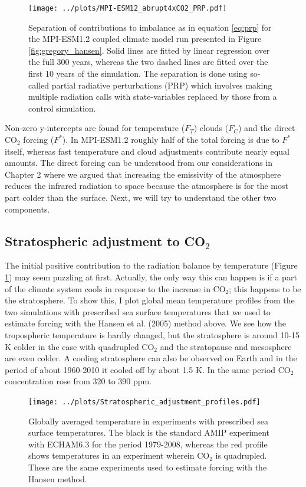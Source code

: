 \documentclass[12pt]{book}
\begin{document}
\begin{figure}
\begin{center}
\texttt{[image: ../plots/MPI-ESM12\_abrupt4xCO2\_PRP.pdf]}
\end{center}
\caption{ Separation of contributions to imbalance as in equation \ref{eq:prp} for the MPI-ESM1.2 coupled climate model run presented in Figure \ref{fig:gregory_hansen}. Solid lines are fitted by linear regression over the full 300 years, whereas the two dashed lines are fitted over the first 10 years of the simulation. The separation is done using so-called partial radiative perturbations (PRP) which involves making multiple radiation calls with state-variables replaced by those from a control simulation. } 
\label{fig:mpi-esm1.2_PRP}
\end{figure}

Non-zero y-intercepts are found for temperature ($F_T$) clouds ($F_C$) and the direct CO$_2$ forcing ($F^*$). In MPI-ESM1.2 roughly half of the total forcing is due to $F^*$ itself, whereas fast temperature and cloud adjustments contribute nearly equal amounts. The direct forcing can be understood from our considerations in Chapter 2 where we argued that increasing the emissivity of the atmosphere reduces the infrared radiation to space because the atmosphere is for the most part colder than the surface. Next, we will try to understand the other two components.

\subsection{Stratospheric adjustment to CO$_2$}
The initial positive contribution to the radiation balance by temperature (Figure \ref{fig:mpi-esm1.2_PRP}) may seem puzzling at first. Actually, the only way this can happen is if a part of the climate system cools in response to the increase in CO$_2$; this happens to be the stratosphere. To show this, I plot global mean temperature profiles from the two simulations with prescribed sea surface temperatures that we used to estimate forcing with the Hansen et al. (2005) method above. We see how the tropospheric temperature is hardly changed, but the stratosphere is around 10-15 K colder in the case with quadrupled CO$_2$ and the stratopause and mesosphere are even colder. 
A cooling stratosphere can also be observed on Earth and in the period of about 1960-2010 it cooled off by about 1.5 K. In the same period CO$_2$ concentration rose from 320 to 390 ppm.


\begin{figure}[!]
\begin{center}
\texttt{[image: ../plots/Stratospheric\_adjustment\_profiles.pdf]}
\end{center}
\caption{ Globally averaged temperature in experiments with prescribed sea surface temperatures. The black is the standard AMIP experiment with ECHAM6.3 for the period 1979-2008, whereas the red profile shows temperatures in an experiment wherein CO$_2$ is quadrupled. These are the same experiments used to estimate forcing with the Hansen method. } 
\label{fig:stratospheric_adjustment_profiles}
\end{figure}
\end{document}
